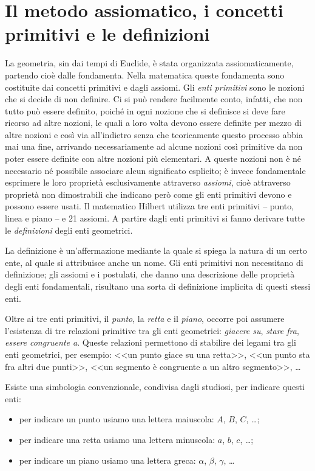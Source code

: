 \section{Il metodo assiomatico, i concetti primitivi e le 
definizioni}\label{sect:metodo_assiomatico_concetti_primitivi}
La geometria, sin dai tempi di Euclide, è stata organizzata 
assiomaticamente, partendo cioè dalle fondamenta. Nella matematica 
queste fondamenta sono costituite dai concetti primitivi e dagli 
assiomi. Gli \emph{enti primitivi} sono le nozioni che si decide di 
non definire. Ci si può rendere facilmente conto, infatti, che non 
tutto può essere definito, poiché in ogni nozione che si definisce si 
deve fare ricorso ad altre nozioni, le quali a loro volta devono 
essere definite per mezzo di altre nozioni e così via all'indietro 
senza che teoricamente questo processo abbia mai una fine, arrivando 
necessariamente ad alcune nozioni così primitive da non poter essere 
definite con altre nozioni più elementari. A queste nozioni non è né 
necessario né possibile associare alcun significato esplicito; è 
invece fondamentale esprimere le loro proprietà esclusivamente 
attraverso \emph{assiomi}, cioè attraverso proprietà non dimostrabili 
che indicano però come gli enti primitivi devono e possono essere 
usati. Il matematico Hilbert utilizza tre enti primitivi -- punto, 
linea e piano -- e 21 assiomi. A partire dagli enti primitivi si 
fanno derivare tutte le \emph{definizioni} degli enti geometrici.

La definizione è un'affermazione mediante la quale si spiega la natura di un 
certo ente, al quale si attribuisce anche un nome. Gli enti primitivi non 
necessitano di definizione; gli assiomi e i postulati, che danno una 
descrizione delle proprietà degli enti fondamentali, risultano una sorta di 
definizione implicita di questi stessi enti.

Oltre ai tre enti primitivi, il \emph{punto}, la 
\emph{retta} e il \emph{piano}, occorre poi assumere l'esistenza di 
tre relazioni primitive tra gli enti geometrici: \emph{giacere su}, 
\emph{stare fra}, \emph{essere congruente a}. Queste relazioni 
permettono di stabilire dei legami tra gli enti geometrici, per 
esempio: <<un punto giace su una retta>>, <<un punto sta fra altri 
due punti>>, <<un segmento è congruente a un altro segmento>>, \ldots

Esiste una simbologia convenzionale, condivisa dagli studiosi, per 
indicare questi enti:
\begin{itemize}
\item per indicare un punto usiamo una lettera maiuscola: \(A\), \(B\), 
\(C\), \ldots;
\item per indicare una retta usiamo una lettera minuscola: \(a\), \(b\), 
\(c\), \ldots;
\item per indicare un piano usiamo una lettera greca: \(\alpha\), 
\(\beta\), \(\gamma\), \ldots
\end{itemize}


